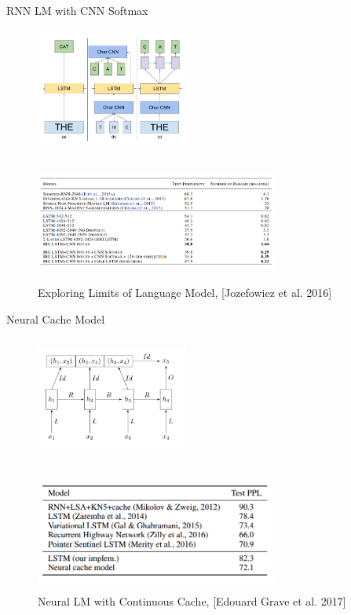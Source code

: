 \documentclass{beamer}
\begin{document}
\begin{frame}{RNN LM with CNN Softmax}
	\vspace*{-2mm}

	\begin{figure}
	   \includegraphics[width=5cm, height=4cm]{figs/exploring_limits_of_lm.png}
	\end{figure}

	\vspace*{-5mm}

	\begin{figure}
	   \includegraphics[width=8cm, height=4cm]{figs/results_exploring1.png}
	   \caption{Exploring Limits of Language Model, [Jozefowiez et al. 2016]}
	\end{figure}
\end{frame}


\begin{frame}{Neural Cache Model}
	\vspace*{-2mm}

	\begin{figure}
	   \includegraphics[width=5cm, height=4cm]{figs/neural_cache_lm.png}
	\end{figure}

	\vspace*{-5mm}

	\begin{figure}
	   \includegraphics[width=8cm, height=4cm]{figs/neural_cache_model_ptb.png}
	   \caption{Neural LM with Continuous Cache, [Edouard Grave et al. 2017]}
	\end{figure}
\end{frame}
\end{document}
